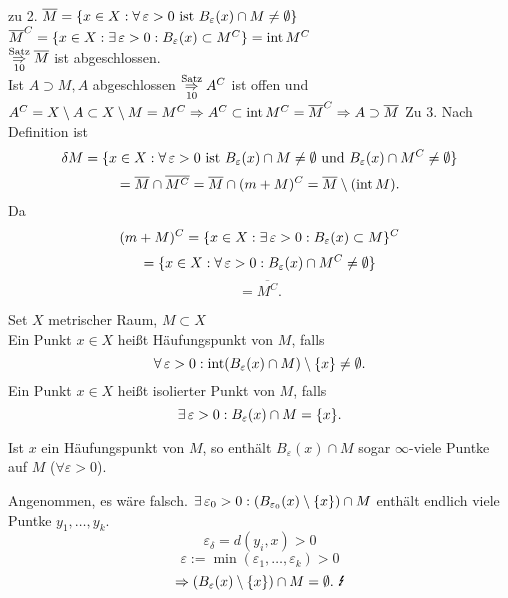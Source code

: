 \documentclass[../ana2.tex]{subfiles}
\begin{document}
\begin{bew}
    zu 2. \( \overline{M} = \set{x \in X: \forall \varepsilon > 0 
    \text{ ist } B_\varepsilon(x) \cap M \neq \emptyset} \) \\
    \( \overline{M}^C = \set{x \in X: \exists \varepsilon > 0: 
    B_\varepsilon(x) \subset M^C} = \inner M^C \) \\
    \( \overset{\text{Satz}}{\underset{\text{10}}{\Rightarrow}} 
    \overline{M} \) ist abgeschlossen.\\
    Ist \(A \supset M, A\) abgeschlossen 
    \( \overset{\text{Satz}}{\underset{\text{10}}{\Rightarrow}}
    A^C \) ist offen und 
    \( A^C = X \setminus A \subset X \setminus M = M^C
    \Rightarrow A^C \subset \operatorname{int} M^C 
    = \overline{M}^C \Rightarrow A \supset \overline{M} \)
    Zu 3. Nach Definition ist 
    \[ \delta M = \set{x \in X : 
    \forall \varepsilon > 0 \text{ ist } 
    B_\varepsilon(x) \cap M \neq \emptyset 
    \text{ und } B_\varepsilon(x) \cap M^C \neq \emptyset} \]
    \[ = \overline{M} \cap \overline{M^C} 
    = \overline{M} \cap (m + M)^C 
    = \overline{M} \setminus (\operatorname{int} M). \]
    Da \[ (m+M)^C = \set{x \in X: \exists \varepsilon > 0: 
    B_\varepsilon(x) \subset M}^C \]
    \[ = \set{ x \in X: \forall \varepsilon > 0: 
    B_\varepsilon(x) \cap M^C \neq \emptyset } \]
    \[ = \overline{M^C}. \]
\end{bew}
\begin{defi}
    Set \(X\) metrischer Raum, \( M \subset X \) \\
    Ein Punkt \( x \in X \) heißt Häufungspunkt von \(M\),
    falls 
    \[ \forall \varepsilon > 0: 
    \inner (B_\varepsilon(x) \cap M) \setminus \set{x} 
    \neq \emptyset. \]
    Ein Punkt \( x \in X \) heißt isolierter Punkt 
    von \( M \), falls 
    \[ \exists \varepsilon > 0: B_\varepsilon(x) \cap M 
    = \set{x}. \]
\end{defi}
\begin{bem}
    Ist \( x \) ein Häufungspunkt von \( M \), 
    so enthält \( B_\varepsilon(x) \cap M \) 
    sogar \( \infty \)-viele Puntke auf \( M \) 
    (\( \forall \varepsilon > 0 \)).
\end{bem}
\begin{bew}
    Angenommen, es wäre falsch.
    \( \exists \varepsilon_0 > 0: 
    (B_{\varepsilon_0}(x) \setminus \set{x}) \cap M \)
    enthält endlich viele Puntke \( y_1, \ldots, y_k \).
    \[ \varepsilon_\delta = d(y_i, x) > 0 \]
    \[ \varepsilon := 
    \min(\varepsilon_1, \dots, \varepsilon_k) > 0 \]
    \[ \Rightarrow (B_\varepsilon(x) \setminus \set{x})
    \cap M = \emptyset. \text{ \Lightning{}} \]
\end{bew}
\end{document}
